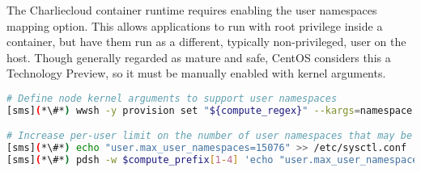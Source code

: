 The Charliecloud container runtime requires enabling the user namespaces mapping
option. This allows applications to run with root privilege inside a container, 
but have them run as a different, typically non-privileged, user on the host.
Though generally regarded as mature and safe, CentOS considers this a Technology
Preview, so it must be manually enabled with kernel arguments.

\begin{lstlisting}[language=bash,keywords={},upquote=true]
# Define node kernel arguments to support user namespaces
[sms](*\#*) wwsh -y provision set "${compute_regex}" --kargs=namespace.unpriv_enable=1

# Increase per-user limit on the number of user namespaces that may be created
[sms](*\#*) echo "user.max_user_namespaces=15076" >> /etc/sysctl.conf
[sms](*\#*) pdsh -w $compute_prefix[1-4] 'echo "user.max_user_namespaces=15076" >> /etc/sysctl.conf'
\end{lstlisting}
